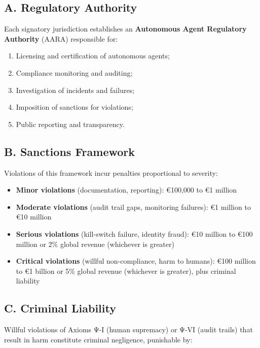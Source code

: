 \subsection*{A. Regulatory Authority}

Each signatory jurisdiction establishes an \textbf{Autonomous Agent Regulatory Authority} (AARA) responsible for:

\begin{enumerate}[leftmargin=1.5cm]
    \item Licensing and certification of autonomous agents;
    \item Compliance monitoring and auditing;
    \item Investigation of incidents and failures;
    \item Imposition of sanctions for violations;
    \item Public reporting and transparency.
\end{enumerate}

\subsection*{B. Sanctions Framework}

Violations of this framework incur penalties proportional to severity:

\begin{itemize}[leftmargin=1.5cm]
    \item \textbf{Minor violations} (documentation, reporting): €100,000 to €1 million
    \item \textbf{Moderate violations} (audit trail gaps, monitoring failures): €1 million to €10 million
    \item \textbf{Serious violations} (kill-switch failure, identity fraud): €10 million to €100 million or 2\% global revenue (whichever is greater)
    \item \textbf{Critical violations} (willful non-compliance, harm to humans): €100 million to €1 billion or 5\% global revenue (whichever is greater), plus criminal liability
\end{itemize}

\subsection*{C. Criminal Liability}

Willful violations of Axioms Ψ-I (human supremacy) or Ψ-VI (audit trails) that result in harm constitute criminal negligence, punishable by:

